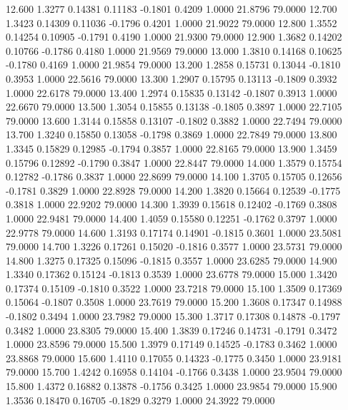   12.600   1.3277   0.14381   0.11183  -0.1801   0.4209   1.0000  21.8796  79.0000
  12.700   1.3423   0.14309   0.11036  -0.1796   0.4201   1.0000  21.9022  79.0000
  12.800   1.3552   0.14254   0.10905  -0.1791   0.4190   1.0000  21.9300  79.0000
  12.900   1.3682   0.14202   0.10766  -0.1786   0.4180   1.0000  21.9569  79.0000
  13.000   1.3810   0.14168   0.10625  -0.1780   0.4169   1.0000  21.9854  79.0000
  13.200   1.2858   0.15731   0.13044  -0.1810   0.3953   1.0000  22.5616  79.0000
  13.300   1.2907   0.15795   0.13113  -0.1809   0.3932   1.0000  22.6178  79.0000
  13.400   1.2974   0.15835   0.13142  -0.1807   0.3913   1.0000  22.6670  79.0000
  13.500   1.3054   0.15855   0.13138  -0.1805   0.3897   1.0000  22.7105  79.0000
  13.600   1.3144   0.15858   0.13107  -0.1802   0.3882   1.0000  22.7494  79.0000
  13.700   1.3240   0.15850   0.13058  -0.1798   0.3869   1.0000  22.7849  79.0000
  13.800   1.3345   0.15829   0.12985  -0.1794   0.3857   1.0000  22.8165  79.0000
  13.900   1.3459   0.15796   0.12892  -0.1790   0.3847   1.0000  22.8447  79.0000
  14.000   1.3579   0.15754   0.12782  -0.1786   0.3837   1.0000  22.8699  79.0000
  14.100   1.3705   0.15705   0.12656  -0.1781   0.3829   1.0000  22.8928  79.0000
  14.200   1.3820   0.15664   0.12539  -0.1775   0.3818   1.0000  22.9202  79.0000
  14.300   1.3939   0.15618   0.12402  -0.1769   0.3808   1.0000  22.9481  79.0000
  14.400   1.4059   0.15580   0.12251  -0.1762   0.3797   1.0000  22.9778  79.0000
  14.600   1.3193   0.17174   0.14901  -0.1815   0.3601   1.0000  23.5081  79.0000
  14.700   1.3226   0.17261   0.15020  -0.1816   0.3577   1.0000  23.5731  79.0000
  14.800   1.3275   0.17325   0.15096  -0.1815   0.3557   1.0000  23.6285  79.0000
  14.900   1.3340   0.17362   0.15124  -0.1813   0.3539   1.0000  23.6778  79.0000
  15.000   1.3420   0.17374   0.15109  -0.1810   0.3522   1.0000  23.7218  79.0000
  15.100   1.3509   0.17369   0.15064  -0.1807   0.3508   1.0000  23.7619  79.0000
  15.200   1.3608   0.17347   0.14988  -0.1802   0.3494   1.0000  23.7982  79.0000
  15.300   1.3717   0.17308   0.14878  -0.1797   0.3482   1.0000  23.8305  79.0000
  15.400   1.3839   0.17246   0.14731  -0.1791   0.3472   1.0000  23.8596  79.0000
  15.500   1.3979   0.17149   0.14525  -0.1783   0.3462   1.0000  23.8868  79.0000
  15.600   1.4110   0.17055   0.14323  -0.1775   0.3450   1.0000  23.9181  79.0000
  15.700   1.4242   0.16958   0.14104  -0.1766   0.3438   1.0000  23.9504  79.0000
  15.800   1.4372   0.16882   0.13878  -0.1756   0.3425   1.0000  23.9854  79.0000
  15.900   1.3536   0.18470   0.16705  -0.1829   0.3279   1.0000  24.3922  79.0000
